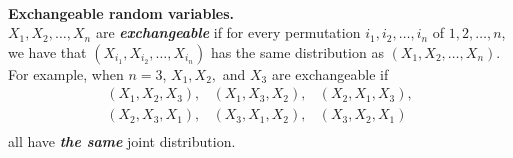 \documentclass[12pt]{article}
\begin{document}
%









\newpage

\label{exchangeability}\\

\noindent \textbf{Exchangeable random variables.} \\
$X_1, X_2, \dots, X_n$ are {\bf\em exchangeable}\label{exchangeability3}
if for every permutation $i_1, i_2, \dots, i_n$ of $1, 2, \dots, n$, we have that $(X_{i_1}, X_{i_2}, \dots, X_{i_n})$ has the same distribution as $(X_1, X_2, \dots, X_n)$.
For example, when $n = 3$, $X_1, X_2, $ and $X_3$ are exchangeable if
$$\begin{array}{ccc}
(X_1, X_2, X_3), & (X_1, X_3, X_2), & (X_2, X_1, X_3), \\
(X_2, X_3, X_1), & (X_3, X_1, X_2), & (X_3, X_2, X_1) \\
\end{array}$$
all have \emph{\textbf{the same}} joint distribution.
\end{document}
